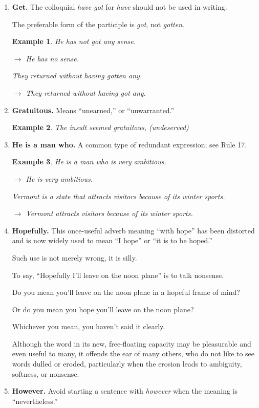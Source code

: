 \documentclass{book}
\numberwithin{equation}{section}
\newtheorem{example}{Example}[chapter]
\begin{document}
\begin{enumerate}
    Not to be used for \textit{fortunate} or \textit{lucky}.
    \item \textbf{Get.} The colloquial \textit{have got} for \textit{have} should not be used in writing.
    
    The preferable form of the participle is \textit{got}, not \textit{gotten}.
    \begin{example}
        He has not got any sense.
        
        $\to$ He has no sense.
        
        They returned without having gotten any.
        
        $\to$ They returned without having got any.
    \end{example}
    \item \textbf{Gratuitous.} Means ``unearned,'' or ``unwarranted.''
    \begin{example}
        The insult seemed gratuitous, (undeserved)
    \end{example}
    \item \textbf{He is a man who.} A common type of redundant expression; see Rule 17.
    \begin{example}
        He is a man who is very ambitious.
        
        $\to$ He is very ambitious.
        
        Vermont is a state that attracts visitors because of its winter sports.
        
        $\to$ Vermont attracts visitors because of its winter sports.
    \end{example}
    \item \textbf{Hopefully.} This once-useful adverb meaning ``with hope'' has been distorted and is now widely used to mean ``I hope'' or ``it is to be hoped.''
    
    Such use is not merely wrong, it is silly.
    
    To say, ``Hopefully I'll leave on the noon plane'' is to talk nonsense.
    
    Do you mean you'll leave on the noon plane in a hopeful frame of mind?
    
    Or do you mean you hope you'll leave on the noon plane?
    
    Whichever you mean, you haven't said it clearly.
    
    Although the word in its new, free-floating capacity may be pleasurable and even useful to many, it offends the ear of many others, who do not like to see words dulled or eroded, particularly when the erosion leads to ambiguity, softness, or nonsense.
    \item \textbf{However.} Avoid starting a sentence with \textit{however} when the meaning is ``nevertheless.''
    

\end{enumerate}
\end{document}
